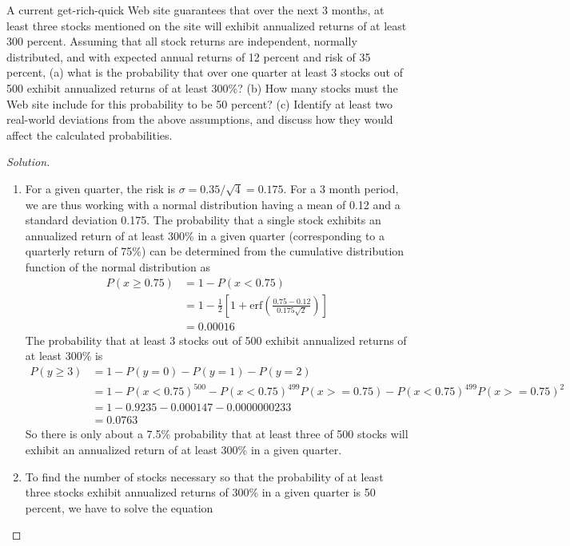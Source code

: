 \begin{problem}{12.8}
  A current get-rich-quick Web site guarantees that over the next 3 months, at least three stocks mentioned on the site will exhibit annualized returns of at least 300 percent. Assuming that all stock returns are independent, normally distributed, and with expected annual returns of 12 percent and risk of 35 percent, (a) what is the probability that over one quarter at least 3 stocks out of 500 exhibit annualized returns of at least 300\%? (b) How many stocks must the Web site include for this probability to be 50 percent? (c) Identify at least two real-world deviations from the above assumptions, and discuss how they would affect the calculated probabilities.
\end{problem}

\begin{proof}[Solution]
  \quad\\
  \begin{enumerate}[label=(\alph*)]
   \item{For a given quarter, the risk is $\sigma=0.35/\sqrt{4}=0.175$. For a 3 month period, we are thus working with a normal distribution having a mean of 0.12 and a standard deviation 0.175. The probability that a single stock exhibits an annualized return of at least 300\%  in a given quarter (corresponding to a quarterly return of 75\%) can be determined from the cumulative distribution function of the normal distribution as
   \begin{align*}
     P(x\ge 0.75) &= 1 - P(x<0.75) \\
	       &= 1 - \frac{1}{2}\left[ 1 + \mathrm{erf}\left(\frac{0.75-0.12}{0.175\sqrt{2}}\right)\right]\\
	       &= 0.00016
   \end{align*}
    The probability that at least 3 stocks out of 500 exhibit annualized returns of at least 300\% is
    \begin{align*}
     P(y\ge 3) &= 1 - P(y=0) - P(y=1) - P(y=2)\\
	       &= 1 - P(x<0.75)^{500} - P(x<0.75)^{499}P(x>=0.75) - P(x<0.75)^{499}P(x>=0.75)^{2}\\
	       &= 1 - 0.9235 - 0.000147 - 0.0000000233 \\
	       &= 0.0763
    \end{align*}
    So there is only about a 7.5\% probability that at least three of 500 stocks will exhibit an annualized return of at least 300\% in a given quarter.
}
  \item{To find the number of stocks necessary so that the probability of at least three stocks exhibit annualized returns of 300\% in a given quarter is 50 percent, we have to solve the equation
}
\end{enumerate}
\end{proof}
